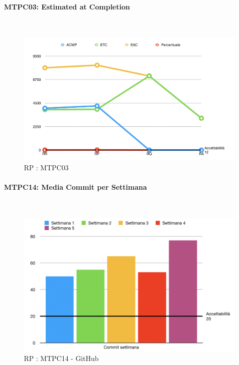 \paragraph{MTPC03: Estimated at Completion}\-\\
\begin{figure}[H]
	\begin{center}
		\includegraphics[scale=0.5]{./images/grafici_RP/MTPC03.png} 
	\end{center}
	\caption{RP : MTPC03}
\end{figure}

\paragraph{MTPC14: Media Commit per Settimana}\-\\
\begin{figure}[H]
	\begin{center}
		\includegraphics[scale=0.5]{./images/grafici_RP/commitGithub.png} 
	\end{center}
	\caption{RP : MTPC14 - GitHub}
\end{figure}

